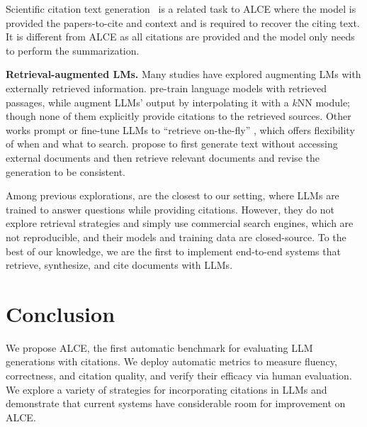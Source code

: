 \documentclass[11pt]{article}
\renewcommand{\paragraph}[1]{\vspace{0.2cm}\noindent\textbf{#1}}
\newcommand{\citeeval}{ALCE}
\begin{document}
Scientific citation text generation~\citep{funkquist2022citebench} is a related task to \citeeval{} where the model is provided the  papers-to-cite and  context and is required to recover the citing text. 
It is different from \citeeval{} 
as all citations are provided
and the model only needs to perform the summarization.







\paragraph{Retrieval-augmented LMs.}
Many studies have explored augmenting LMs with 
externally retrieved information.
\citet{guu2020realm,borgeaud2022retro,izacard2022atlas}
pre-train language models with retrieved passages, 
while \citet{Khandelwal2020Generalization,zhong-etal-2022-training} augment
LLMs' output by interpolating it with a $k$NN module;
though none of them explicitly provide citations to the retrieved sources.
Other works prompt or fine-tune LLMs to 
``retrieve on-the-fly'' \citep{parisi2022talm,schick2023toolformer,shuster-etal-2022-language,jiang2023active,yao2023react,press2022measuring},
which offers flexibility of when and what to search.
\citet{gao2022rarr,he2022rethinking} propose to first generate text without accessing external documents and then
retrieve relevant documents and revise the generation to be consistent. %

Among previous explorations, \citet{nakano2021webgpt,menick2022teaching} 
are the closest to our setting, where
LLMs are trained to answer questions while providing citations. 
However, they do not explore retrieval strategies and simply use commercial search engines, which are not reproducible, and their models and training data are closed-source.
To the best of our knowledge, 
we are the first to implement end-to-end systems that retrieve, synthesize, and cite documents with LLMs.







\section{Conclusion}

We propose \citeeval{}, the first automatic benchmark for evaluating LLM generations with citations.
We deploy automatic metrics to measure fluency, correctness, and citation quality, and verify their efficacy via human evaluation.
We explore a variety of strategies for incorporating citations in LLMs
and demonstrate that current systems have considerable room for improvement on \citeeval{}.
\end{document}
